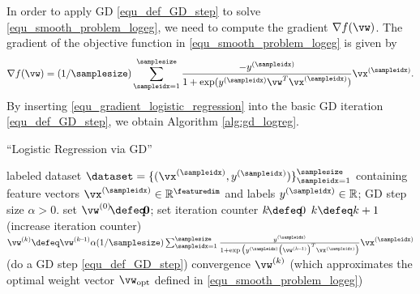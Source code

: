 \documentclass[12pt]{report}
\begin{document}
In order to apply GD \eqref{equ_def_GD_step} to solve \eqref{equ_smooth_problem_logeg}, we need to compute the gradient $\nabla f(\vw)$. 
The gradient of the objective function in \eqref{equ_smooth_problem_logeg} is given by 
\begin{equation}
\label{equ_gradient_logistic_regression}
\nabla f(\vw) = (1/\samplesize) \sum_{\sampleidx=1}^{\samplesize} \frac{-y^{(\sampleidx)}}{1 + \exp ( y^{(\sampleidx)} \vw^{T} \vx^{(\sampleidx)})} \vx^{(\sampleidx)}.
\end{equation} 
By inserting \eqref{equ_gradient_logistic_regression} into the basic GD iteration \eqref{equ_def_GD_step}, we obtain Algorithm \ref{alg:gd_logreg}. 
\begin{algorithm}[htbp]
\caption{``Logistic Regression via GD''}\label{alg:gd_logreg}
\begin{algorithmic}[1]
\renewcommand{\algorithmicrequire}{\textbf{Input:}}
\renewcommand{\algorithmicensure}{\textbf{Output:}}
\Require   labeled dataset $\dataset=\{ (\vx^{(\sampleidx)}, y^{(\sampleidx)}) \}_{\sampleidx=1}^{\samplesize}$ containing feature vectors 
$\vx^{(\sampleidx)} \in \mathbb{R}^{\featuredim}$ and labels $y^{(\sampleidx)} \in \mathbb{R}$; GD step size $\alpha >0$. 
\Statex\hspace{-6mm}{\bf Initialize:}set $\vw^{(0)}\!\defeq\!\mathbf{0}$; set iteration counter $k\!\defeq\!0$   
\Repeat 
\State $k \defeq k +1$    (increase iteration counter) 
\State  $\vw^{(k)} \defeq \vw^{(k\!-\!1)}  \alpha (1/\samplesize) \sum_{\sampleidx=1}^{\samplesize} \frac{y^{(\sampleidx)}}{1 + \exp \big( y^{(\sampleidx)} \big(\vw^{(k\!-\!1)}\big)^{T} \vx^{(\sampleidx)}\big)} \vx^{(\sampleidx)}$  (do a GD step \eqref{equ_def_GD_step})
\Until convergence 
\Ensure $\vw^{(k)}$ (which approximates the optimal weight vector $\vw_{\rm opt}$ defined in \eqref{equ_smooth_problem_logeg})
\end{algorithmic}
\end{algorithm}
\end{document}
